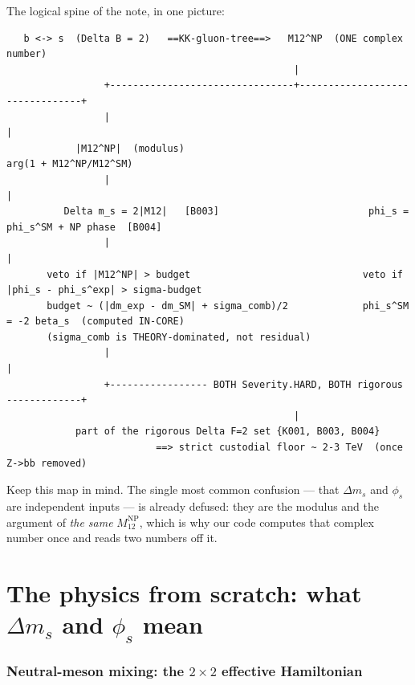 \documentclass[11pt]{article}
\newcommand{\dms}{\Delta m_s}
\newcommand{\phis}{\phi_s}
\newcommand{\MtwelveNP}{M_{12}^{\mathrm{NP}}}
\theoremstyle{definition}
\begin{document}
\noindent The logical spine of the note, in one picture:
\begin{footnotesize}
\begin{verbatim}
   b <-> s  (Delta B = 2)   ==KK-gluon-tree==>   M12^NP  (ONE complex number)
                                                  |
                 +--------------------------------+--------------------------------+
                 |                                                                 |
            |M12^NP|  (modulus)                                          arg(1 + M12^NP/M12^SM)
                 |                                                                 |
          Delta m_s = 2|M12|   [B003]                          phi_s = phi_s^SM + NP phase  [B004]
                 |                                                                 |
       veto if |M12^NP| > budget                              veto if |phi_s - phi_s^exp| > sigma-budget
       budget ~ (|dm_exp - dm_SM| + sigma_comb)/2             phi_s^SM = -2 beta_s  (computed IN-CORE)
       (sigma_comb is THEORY-dominated, not residual)
                 |                                                                 |
                 +----------------- BOTH Severity.HARD, BOTH rigorous -------------+
                                                  |
            part of the rigorous Delta F=2 set {K001, B003, B004}
                          ==> strict custodial floor ~ 2-3 TeV  (once Z->bb removed)
\end{verbatim}
\end{footnotesize}
\noindent Keep this map in mind. The single most common confusion --- that
$\dms$ and $\phis$ are independent inputs --- is already defused: they are the
modulus and the argument of \emph{the same} $\MtwelveNP$, which is why our code
computes that complex number once and reads two numbers off it.

\part{The physics from scratch: what $\dms$ and $\phis$ mean}
\label{part:sm}

\section{Neutral-meson mixing: the $2\times 2$ effective Hamiltonian}
\label{sec:mixing}
\end{document}

